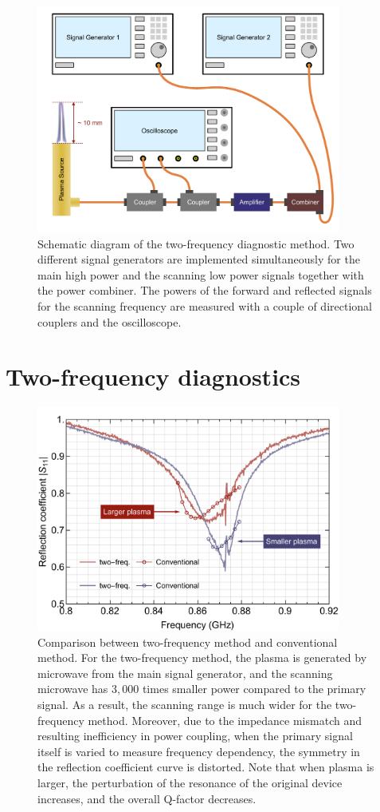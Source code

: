 \begin{figure}[ht!]
\centering
\includegraphics[width=100mm]{figures/ap7/twoFreq/twoFreq.pdf}
\caption{Schematic diagram of the two-frequency diagnostic method. Two different signal generators are implemented simultaneously for the main high power and the scanning low power signals together with the power combiner. The powers of the forward and reflected signals for the scanning frequency are measured with a couple of directional couplers and the oscilloscope.}
\label{fig:twoFreq}
\end{figure}

\section{Two-frequency diagnostics}
\label{sec:ap7-2}

\begin{figure}[h!]
\centering
\includegraphics[width=100mm]{figures/ap7/comparison/comparison.pdf}
\caption{Comparison between two-frequency method and conventional method. For the two-frequency method, the plasma is generated by microwave from the main signal generator, and the scanning microwave has $3,000$ times smaller power compared to the primary signal. As a result, the scanning range is much wider for the two-frequency method. Moreover, due to the impedance mismatch and resulting inefficiency in power coupling, when the primary signal itself is varied to measure frequency dependency, the symmetry in the reflection coefficient curve is distorted. Note that when plasma is larger, the perturbation of the resonance of the original device increases, and the overall Q-factor decreases.}
\label{fig:twoFreqComparison}
\end{figure}

